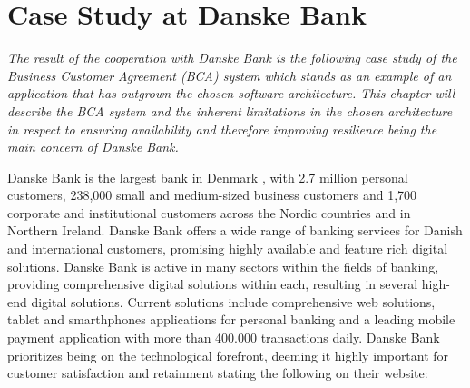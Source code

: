 \chapter{Case Study at Danske Bank}
\textit{The result of the cooperation with Danske Bank is the following case study of the Business Customer Agreement (BCA) system which stands as an example of an application that has outgrown the chosen software architecture. This chapter will describe the BCA system and the inherent limitations in the chosen architecture in respect to ensuring availability and therefore improving resilience being the main concern of Danske Bank.}

Danske Bank is the largest bank in Denmark \cite[p.~38]{danske_bank_setting_up_in_denmark}, with 2.7 million personal customers, 238,000 small and medium-sized business customers and 1,700 corporate and institutional customers across the Nordic countries and in Northern Ireland. Danske Bank offers a wide range of banking services for Danish and international customers, promising highly available and feature rich digital solutions. Danske Bank is active in many sectors within the fields of banking, providing comprehensive digital solutions within each, resulting in several high-end digital solutions. Current solutions include comprehensive web solutions, tablet and smarthphones applications for personal banking and a leading mobile payment application with more than 400.000 transactions daily. Danske Bank prioritizes being on the technological forefront, deeming it highly important for customer satisfaction and retainment stating the following on their website\cite{danske_bank_our_essence}:




